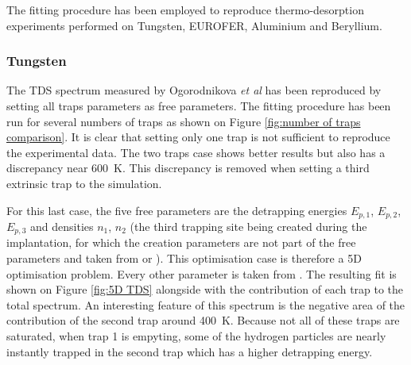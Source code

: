 

The fitting procedure has been employed to reproduce thermo-desorption experiments performed on Tungsten, EUROFER, Aluminium and Beryllium.


\subsubsection{Tungsten}

The TDS spectrum measured by Ogorodnikova \textit{et al}  has been reproduced by setting all traps parameters as free parameters.
The fitting procedure has been run for several numbers of traps as shown on Figure \ref{fig:number of traps comparison}.
It is clear that setting only one trap is not sufficient to reproduce the experimental data.
The two traps case shows better results but also has a discrepancy near \SI{600}{K}.
This discrepancy is removed when setting a third extrinsic trap to the simulation.

For this last case, the five free parameters are the detrapping energies $E_{p, 1}$, $E_{p, 2}$, $E_{p, 3}$ and densities $n_1$, $n_2$ (the third trapping site being created during the implantation, for which the creation parameters are not part of the free parameters and taken from \cite{ogorodnikova_deuterium_2003} or ).
This optimisation case is therefore a 5D optimisation problem.
Every other parameter is taken from \cite{hodille_macroscopic_2015}.
The resulting fit is shown on Figure \ref{fig:5D TDS} alongside with the contribution of each trap to the total spectrum.
An interesting feature of this spectrum is the negative area of the contribution of the second trap around \SI{400}{K}.
Because not all of these traps are saturated, when trap 1 is empyting, some of the hydrogen particles are nearly instantly trapped in the second trap which has a higher detrapping energy.

